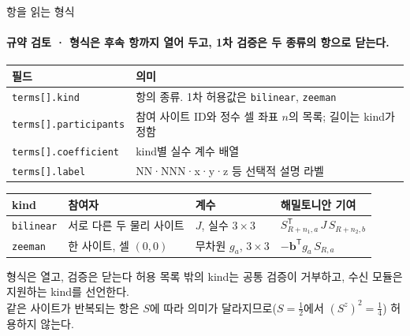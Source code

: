 \begin{frame}[label=term-schema]{항을 읽는 형식}
  \framesubtitle{규약 검토 · 형식은 후속 항까지 열어 두고, 1차 검증은 두 종류의 항으로 닫는다.}
  \small\renewcommand{\arraystretch}{1.12}
  \begin{tabularx}{\textwidth}{@{}p{4.1cm}Y@{}}
    \toprule
    필드 & 의미 \\
    \midrule
    \texttt{terms[].kind} & 항의 종류. 1차 허용값은 \texttt{bilinear}, \texttt{zeeman} \\
    \texttt{terms[].participants} & 참여 사이트 ID와 정수 셀 좌표 $n$의 목록; 길이는 kind가 정함 \\
    \texttt{terms[].coefficient} & kind별 실수 계수 배열 \\
    \texttt{terms[].label} & NN·NNN·x·y·z 등 선택적 설명 라벨 \\
    \bottomrule
  \end{tabularx}
  \par\smallskip
  \begin{tabularx}{\textwidth}{@{}p{1.6cm}p{3.2cm}p{2.6cm}Y@{}}
    \toprule
    kind & 참여자 & 계수 & 해밀토니안 기여 \\
    \midrule
    \texttt{bilinear} & 서로 다른 두 물리 사이트 & $J$, 실수 $3\times3$ & $S_{R+n_1,a}^{\mathsf T}\,J\,S_{R+n_2,b}$ \\
    \texttt{zeeman} & 한 사이트, 셀 $(0,0)$ & 무차원 $g_a$, $3\times3$ & $-\mathbf b^{\mathsf T}g_a\,S_{R,a}$ \\
    \bottomrule
  \end{tabularx}
  \par\smallskip
  \begin{band}{형식은 열고, 검증은 닫는다}
    허용 목록 밖의 kind는 공통 검증이 거부하고, 수신 모듈은 지원하는 kind를 선언한다.\\
    같은 사이트가 반복되는 항은 $S$에 따라 의미가 달라지므로($S=\tfrac12$에서 $(S^z)^2=\tfrac14$) 허용하지 않는다.
  \end{band}
\end{frame}

